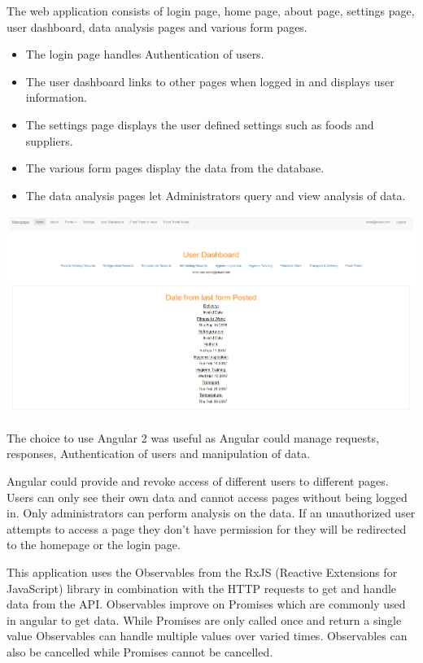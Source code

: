 The web application consists of login page, home page, about page, settings page, user dashboard, data analysis pages and various form pages.
\begin{itemize}
\item The login page handles Authentication of users.
\item The user dashboard links to other pages when logged in and displays user information.
\item The settings page displays the user defined settings such as foods and suppliers.
\item The various form pages display the data from the database.
\item The data analysis pages let Administrators query and view analysis of data.
\end{itemize}

\begin{center}    
    \includegraphics[width=140mm]{img/web/dashboard.png}
\end{center}

The choice to use Angular 2 was useful as Angular could manage requests, responses, Authentication of users and manipulation of data. 

Angular could provide and revoke access of different users to different pages. Users can only see their own data and cannot access pages without being logged in. Only administrators can perform analysis on the data. If an unauthorized user attempts to access a page they don’t have permission for they will be redirected to the homepage or the login page.

This application uses the Observables from the RxJS (Reactive Extensions for JavaScript) library in combination with the HTTP requests to get and handle data from the API. Observables improve on Promises which are commonly used in angular to get data. While Promises are only called once and return a single value Observables can handle multiple values over varied times. Observables can also be cancelled while Promises cannot be cancelled.\\

